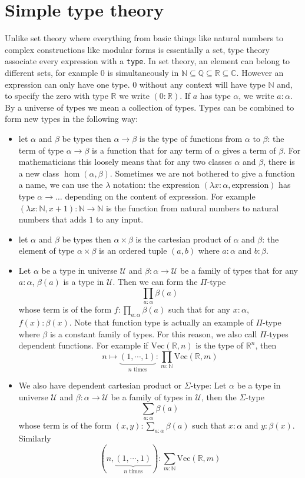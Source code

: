 \documentclass{report}
\theoremstyle{definition}
\begin{document}
\section{Simple type theory}
Unlike set theory where everything from basic things like natural numbers to complex constructions like modular forms is essentially a set, type theory associate every expression with a {\tt \small type}. In set theory, an element can belong to different sets, for example $0$ is simultaneously in $\mathbb N\subseteq\mathbb Q\subseteq\mathbb R\subseteq\mathbb C$. However an expression can only have one type. $0$ without any context will have type $\mathbb N$ and, to specify the zero with type $\mathbb R$ we write $(0:\mathbb R)$. If $a$ has type $\alpha$, we write $a:\alpha$. By a universe of types we mean a collection of types. Types can be combined to form new types in the following way:
\begin{itemize}
  \item let $\alpha$ and $\beta$ be types then $\alpha\to\beta$ is the type of functions from $\alpha$ to $\beta$: the term of type $\alpha\to\beta$ is a function that for any term of $\alpha$ gives a term of $\beta$. For mathematicians this loosely means that for any two classes $\alpha$ and $\beta$, there is a new class $\hom(\alpha,\beta)$. Sometimes we are not bothered to give a function a name, we can use the $\lambda$ notation: the expression $(\lambda x:\alpha, \text{expression})$ has type $\alpha\to\dots$ depending on the content of expression. For example $(\lambda x:\mathbb N, x+1):\mathbb{N}\to\mathbb{N}$ is the function from natural numbers to natural numbers that adds $1$ to any input.
  \item let $\alpha$ and $\beta$ be types then $\alpha\times\beta$ is the cartesian product of $\alpha$ and $\beta$: the element of type $\alpha\times\beta$ is an ordered tuple $(a,b)$ where $a:\alpha$ and $b:\beta$.
  \item Let $\alpha$ be a type in universe $\mathcal U$ and $\beta:\alpha\to\mathcal U$ be a family of types that for any $a:\alpha$, $\beta(a)$ is a type in $\mathcal U$. Then we can form the $\Pi$-type $$\prod_{a:\alpha}\beta(a)$$ whose term is of the form $f:\prod_{a:\alpha}\beta(a)$ such that for any $x:\alpha$, $f(x):\beta(x)$. Note that function type is actually an example of $\Pi$-type where $\beta$ is a constant family of types. For this reason, we also call $\Pi$-types dependent functions. For example if $\mathrm{Vec}(\mathbb{R},n)$ is the type of $\mathbb R^n$, then 
    $$n\mapsto\underbrace{(1,\cdots,1)}_{n\text{ times}}:\prod_{m:\mathbb N} \mathrm{Vec}(\mathbb R, m)$$
  \item We also have dependent cartesian product or $\Sigma$-type: Let $\alpha$ be a type in universe $\mathcal U$ and $\beta:\alpha\to\mathcal U$ be a family of types in $\mathcal U$, then the $\Sigma$-type $$\sum_{a:\alpha}\beta(a)$$ whose term is of the form $(x,y):\sum_{a:\alpha}\beta(a)$ such that $x:\alpha$ and $y:\beta(x)$. Similarly $$\left(n,\underbrace{(1,\cdots,1)}_{n\text{ times}}\right):\sum_{m:\mathbb N} \mathrm{Vec}(\mathbb R, m)$$
\end{itemize}
\end{document}
